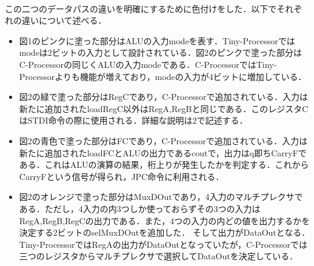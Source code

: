 \documentclass[dvipdfmx]{jarticle}
\begin{document}
\\この二つのデータパスの違いを明確にするために色付けをした．以下でそれぞれの違いについて述べる．
\begin{itemize}
  \item 図1のピンクに塗った部分はALUの入力modeを表す．Tiny-Processorではmodeは2ビットの入力として設計されている．図2のピンクで塗った部分は
  C-Processorの同じくALUの入力modeである．C-ProcessorではTiny-Processorよりも機能が増えており，modeの入力が4ビットに増加している．
  \item 図2の緑で塗った部分はRegCであり，C-Processorで追加されている．入力は新たに追加されたloadRegC以外はRegA,RegBと同じである．このレジスタCはSTDI命令の際に使用される．詳細な説明は2で記述する．
  \item 図2の青色で塗った部分はFCであり，C-Processorで追加されている．入力は新たに追加されたloadFCとALUの出力であるcoutで，出力はq即ちCarryFである．これはALUの演算の結果，桁上りが発生したかを判定する．これからCarryFという信号が得られ，JPC命令に利用される．
  \item 図2のオレンジで塗った部分はMuxDOutであり，4入力のマルチプレクサである．ただし，4入力の内3つしか使っておらずその3つの入力はRegA,RegB,RegCの出力である．また，4つの入力の内どの値を出力するかを決定する2ビットのselMuxDOutを追加した．
  そして出力がDataOutとなる．Tiny-ProcessorではRegAの出力がDataOutとなっていたが，C-Processorでは三つのレジスタからマルチプレクサで選択してDataOutを決定している．
\end{itemize}
\clearpage
\end{document}

